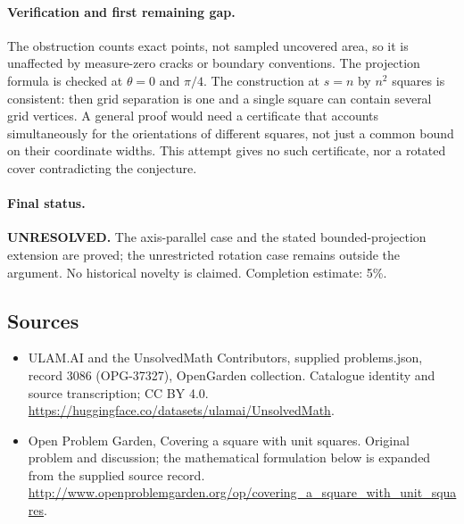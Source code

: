 \documentclass[11pt,a4paper]{article}
\begin{document}
\paragraph{Verification and first remaining gap.}
The obstruction counts exact points, not sampled uncovered area, so it is
unaffected by measure-zero cracks or boundary conventions. The projection
formula is checked at $\theta=0$ and $\pi/4$. The construction at $s=n$ by
$n^2$ squares is consistent: then grid separation is one and a single square
can contain several grid vertices. A general proof would need a certificate
that accounts simultaneously for the orientations of different squares,
not just a common bound on their coordinate widths. This attempt gives no
such certificate, nor a rotated cover contradicting the conjecture.

\paragraph{Final status.}
\textbf{UNRESOLVED.} The axis-parallel case and the stated bounded-projection
extension are proved; the unrestricted rotation case remains outside the
argument. No historical novelty is claimed. Completion estimate: 5\%.

\subsection{Sources}
\begin{itemize}
\item[S1] ULAM.AI and the UnsolvedMath Contributors, supplied problems.json, record 3086 (OPG-37327), OpenGarden collection. Catalogue identity and source transcription; CC BY 4.0.
\url{https://huggingface.co/datasets/ulamai/UnsolvedMath}.
\item[S2] Open Problem Garden, Covering a square with unit squares. Original problem and discussion; the mathematical formulation below is expanded from the supplied source record.
\url{http://www.openproblemgarden.org/op/covering_a_square_with_unit_squares}.

\end{itemize}
\end{document}
